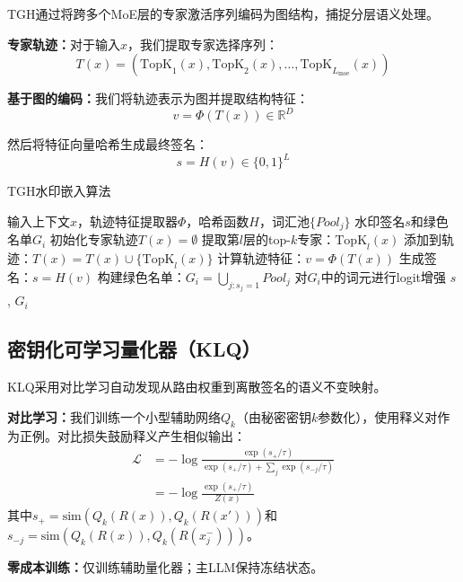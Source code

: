 \documentclass[letterpaper,twocolumn,10pt]{article}
\begin{document}
TGH通过将跨多个MoE层的专家激活序列编码为图结构，捕捉分层语义处理。

\textbf{专家轨迹：}对于输入$x$，我们提取专家选择序列：
\begin{equation}
T(x) = (\text{TopK}_1(x), \text{TopK}_2(x), \ldots, \text{TopK}_{L_{\text{moe}}}(x))
\end{equation}

\textbf{基于图的编码：}我们将轨迹表示为图并提取结构特征：
\begin{equation}
v = \Phi(T(x)) \in \mathbb{R}^D
\end{equation}

然后将特征向量哈希生成最终签名：
\begin{equation}
s = H(v) \in \{0,1\}^L
\end{equation}

\begin{algorithm}[h]
\caption{TGH水印嵌入算法}
\begin{algorithmic}[1]
\REQUIRE 输入上下文$x$，轨迹特征提取器$\Phi$，哈希函数$H$，词汇池$\{Pool_j\}$
\ENSURE 水印签名$s$和绿色名单$G_i$
\STATE 初始化专家轨迹$T(x) = \emptyset$
    \STATE 提取第$l$层的top-$k$专家：$\text{TopK}_l(x)$
    \STATE 添加到轨迹：$T(x) = T(x) \cup \{\text{TopK}_l(x)\}$
\ENDFOR
\STATE 计算轨迹特征：$v = \Phi(T(x))$
\STATE 生成签名：$s = H(v)$
\STATE 构建绿色名单：$G_i = \bigcup_{j: s_j=1} Pool_j$
\STATE 对$G_i$中的词元进行logit增强
\RETURN $s$, $G_i$
\end{algorithmic}
\end{algorithm}

\subsection{密钥化可学习量化器（KLQ）}

KLQ采用对比学习自动发现从路由权重到离散签名的语义不变映射。

\textbf{对比学习：}我们训练一个小型辅助网络$Q_k$（由秘密密钥$k$参数化），使用释义对作为正例。对比损失鼓励释义产生相似输出：
\begin{align}
\mathcal{L} &= -\log \frac{\exp(s_{+}/\tau)}{\exp(s_{+}/\tau) + \sum_j \exp(s_{-j}/\tau)} \nonumber \\
&= -\log \frac{\exp(s_{+}/\tau)}{Z(x)} \label{eq:contrastive_loss}
\end{align}
其中$s_{+} = \text{sim}(Q_k(R(x)), Q_k(R(x')))$和$s_{-j} = \text{sim}(Q_k(R(x)), Q_k(R(x_j^-)))$。

\textbf{零成本训练：}仅训练辅助量化器；主LLM保持冻结状态。
\end{document}
